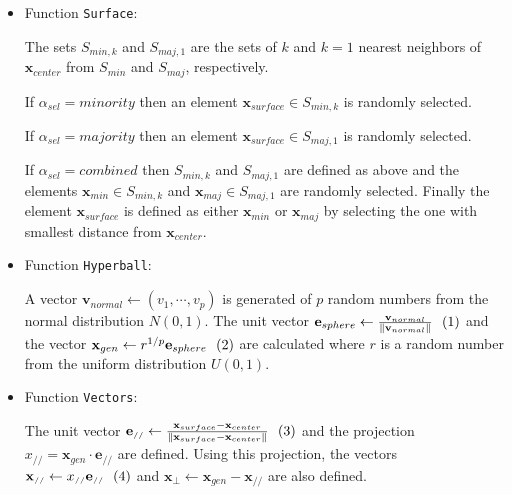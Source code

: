 \documentclass[parskip=full]{scrartcl}
\newcommand{\inlineeqnum}{\refstepcounter{equation}~~\mbox{(\theequation)}}
\begin{document}
\begin{itemize}
	
	\renewcommand\labelitemi{--}
	
	\item Function \texttt{Surface}:
	
		The sets  \( S_{min, k} \) and \( S_{maj, 1} \) are the sets of \( k \)
		and \( k = 1 \) nearest neighbors of \( \textbf{x}_{center} \) from \(
		S_{min} \) and \( S_{maj} \), respectively.
	
		If \( \alpha_{sel} = minority \) then an element \( \textbf{x}_{surface}
		\in S_{min, k}\) is randomly selected.
			
		If \( \alpha_{sel} = majority \) then an element \( \textbf{x}_{surface}
		\in S_{maj, 1}\) is randomly selected.
			
		If \( \alpha_{sel} = combined \) then \( S_{min, k} \) and \( S_{maj, 1}
		\) are defined as above and the elements \( \textbf{x}_{min} \in S_{min,
		k}\) and  \( \textbf{x}_{maj} \in S_{maj, 1}\) are randomly selected.
		Finally the element \( \textbf{x}_{surface} \) is defined as either
		\(\textbf{x}_{min} \) or \( \textbf{x}_{maj} \) by selecting the one
		with smallest distance from \( \textbf{x}_{center} \).
			
	
	\item Function \texttt{Hyperball}:
		
		A vector \( \textbf{v}_{normal} \leftarrow (v_{1}, \cdots, v_{p}) \) is
		generated of \( p \) random numbers from the normal distribution \( N(0,
		1) \). The unit vector \( \textbf{e}_{sphere} \leftarrow
		\frac{\textbf{v}_{normal}}{ \|\textbf{v}_{normal} \|}
		\inlineeqnum\label{eqn:sphere} \) and the vector \( \textbf{x}_{gen}
		\leftarrow r^{1 / p} \textbf{e}_{sphere} \inlineeqnum\label{eqn:ball} \)
		are calculated where \( r \) is a random number from the uniform
		distribution \( U(0, 1) \).
			
	\item Function \texttt{Vectors}:
	
		The unit vector \( \textbf{e}_{\scriptscriptstyle//} \leftarrow
		\frac{\textbf{x}_{surface} - \textbf{x}_{center}}{
		\|\textbf{x}_{surface} - \textbf{x}_{center} \|}
		\inlineeqnum\label{eqn:unit} \) and the projection  \(
		x_{\scriptscriptstyle//} = \textbf{x}_{gen} \cdot
		\textbf{e}_{\scriptscriptstyle//} \)  are defined. Using this
		projection, the vectors \( \textbf{x}_{\scriptscriptstyle//} \leftarrow
		x_{\scriptscriptstyle//} \textbf{e}_{\scriptscriptstyle//}
		\inlineeqnum\label{eqn:parallel} \) and \( \textbf{x}_{\bot} \leftarrow
		\textbf{x}_{gen} - \textbf{x}_{\scriptscriptstyle//} \) are also
		defined.
	 		

\end{itemize}
\end{document}
